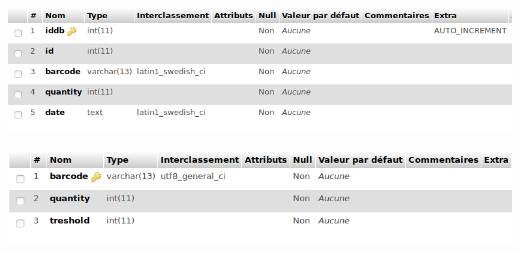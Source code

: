 \documentclass[french,10pt,a4paper]{report}
\begin{document}
\begin{center}
	\includegraphics[scale=0.36]{captures/command.png}
\end{center}
\begin{center}
	\includegraphics[scale=0.4]{captures/stock.png}
\end{center}
\end{document}
